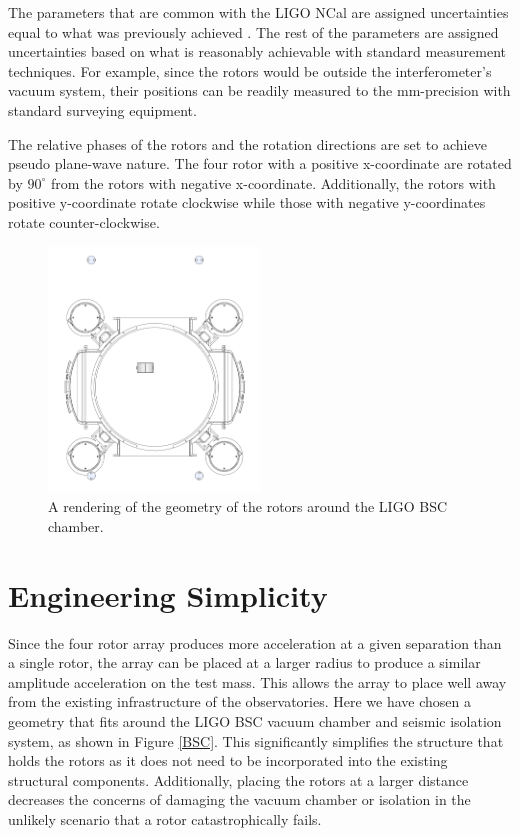\documentclass[superscriptaddress, twocolumn, prd]{revtex4-1}
\begin{document}
The parameters that are common with the LIGO NCal are assigned uncertainties equal to what was previously achieved \cite{ncal}. The rest of the parameters are assigned uncertainties based on what is reasonably achievable with standard measurement techniques. For example, since the rotors would be outside the interferometer's vacuum system, their positions can be readily measured to the mm-precision with standard surveying equipment.

The relative phases of the rotors and the rotation directions are set to achieve pseudo plane-wave nature. The four rotor with a positive x-coordinate are rotated by $90^\circ$ from the rotors with negative x-coordinate. Additionally, the rotors with positive y-coordinate rotate clockwise while those with negative y-coordinates rotate counter-clockwise. 

\begin{figure}[!h]
\centering \includegraphics[width=0.5\textwidth]{Super4BSCTopDown.pdf}
\caption{A rendering of the geometry of the rotors around the LIGO BSC chamber.}
\label{bsc} 
\end{figure}

\section{Engineering Simplicity}

Since the four rotor array produces more acceleration at a given separation than a single rotor, the array can be placed at a larger radius to produce a similar amplitude acceleration on the test mass. This allows the array to place well away from the existing infrastructure of the observatories. Here we have chosen a geometry that fits around the LIGO BSC vacuum chamber and seismic isolation system, as shown in Figure \ref{BSC}. This significantly simplifies the structure that holds the rotors as it does not need to be incorporated into the existing structural components. Additionally, placing the rotors at a larger distance decreases the concerns of damaging the vacuum chamber or isolation in the unlikely scenario that a rotor catastrophically fails.
\end{document}

